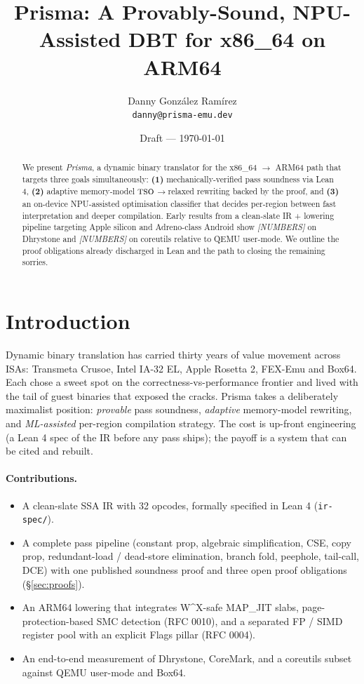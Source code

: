 \documentclass[11pt,a4paper]{article}
\title{Prisma: A Provably-Sound, NPU-Assisted DBT for x86_64 on ARM64}
\author{Danny Gonz\'{a}lez Ram\'{i}rez \\ \texttt{danny@prisma-emu.dev}}
\date{Draft --- \today}
\begin{document}
\maketitle

\begin{abstract}
We present \emph{Prisma}, a dynamic binary translator for the
x86\_64 \(\rightarrow\) ARM64 path that targets three goals
simultaneously: \textbf{(1)} mechanically-verified pass soundness
via Lean 4, \textbf{(2)} adaptive memory-model
\(\textsc{tso}\)\(\rightarrow\)relaxed rewriting backed by the
proof, and \textbf{(3)} an on-device NPU-assisted optimisation
classifier that decides per-region between fast interpretation and
deeper compilation. Early results from a clean-slate IR + lowering
pipeline targeting Apple silicon and Adreno-class Android show
\emph{[NUMBERS]} on Dhrystone and \emph{[NUMBERS]} on coreutils
relative to QEMU user-mode. We outline the proof obligations
already discharged in Lean and the path to closing the remaining
sorries.
\end{abstract}

\section{Introduction}
\label{sec:intro}

Dynamic binary translation has carried thirty years of value
movement across ISAs: Transmeta Crusoe, Intel IA-32 EL, Apple
Rosetta 2, FEX-Emu and Box64. Each chose a sweet spot on the
correctness-vs-performance frontier and lived with the tail of
guest binaries that exposed the cracks. Prisma takes a deliberately
maximalist position: \emph{provable} pass soundness, \emph{adaptive}
memory-model rewriting, and \emph{ML-assisted} per-region
compilation strategy. The cost is up-front engineering (a Lean 4
spec of the IR before any pass ships); the payoff is a system that
can be cited and rebuilt.

\paragraph{Contributions.}
\begin{itemize}
  \item A clean-slate SSA IR with 32 opcodes, formally specified
        in Lean 4 (\texttt{ir-spec/}).
  \item A complete pass pipeline (constant prop, algebraic
        simplification, CSE, copy prop, redundant-load /
        dead-store elimination, branch fold, peephole, tail-call,
        DCE) with one published soundness proof and three open
        proof obligations (\S\ref{sec:proofs}).
  \item An ARM64 lowering that integrates W\^{}X-safe MAP\_JIT
        slabs, page-protection-based SMC detection (RFC 0010),
        and a separated FP / SIMD register pool with an explicit
        Flags pillar (RFC 0004).
  \item An end-to-end measurement of Dhrystone, CoreMark, and
        a coreutils subset against QEMU user-mode and Box64.
\end{itemize}
\end{document}
